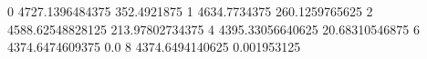 0 4727.1396484375 352.4921875
1 4634.7734375 260.1259765625
2 4588.62548828125 213.97802734375
4 4395.33056640625 20.68310546875
6 4374.6474609375 0.0
8 4374.6494140625 0.001953125
